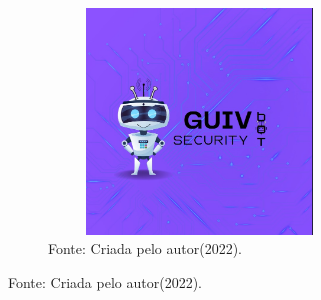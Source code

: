 \begin{figure}[!htb]
\centering
\captionsetup[subfigure]{labelformat=empty}
\caption{``GUIV''}
\begin{subfigure}{.5\textwidth}
\centering
\includegraphics[width=8cm,height=6cm]{Partes/Imagens/Guiv S.jpeg}
\caption{Fonte: Criada pelo autor(2022).}
\end{subfigure}%
\end{figure}

